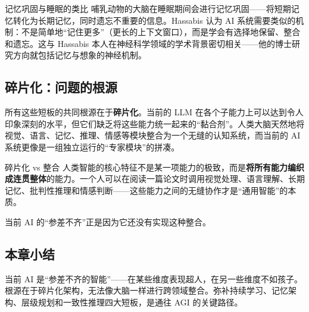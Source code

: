 \begin{knowledgebox}{记忆巩固与睡眠的类比}
哺乳动物的大脑在睡眠期间会进行记忆巩固——将短期记忆转化为长期记忆，同时遗忘不重要的信息。Hassabis 认为 AI 系统需要类似的机制：不是简单地``记住更多''（更长的上下文窗口），而是学会有选择地保留、整合和遗忘。这与 Hassabis 本人在神经科学领域的学术背景密切相关——他的博士研究方向就包括记忆与想象的神经机制。
\end{knowledgebox}

\subsection{碎片化：问题的根源}

所有这些短板的共同根源在于\textbf{碎片化}。当前的 LLM 在各个子能力上可以达到令人印象深刻的水平，但它们缺乏将这些能力统一起来的``黏合剂''。人类大脑天然地将视觉、语言、记忆、推理、情感等模块整合为一个无缝的认知系统，而当前的 AI 系统更像是一组独立运行的``专家模块''的拼凑。

\begin{importantbox}{碎片化 vs 整合}
人类智能的核心特征不是某一项能力的极致，而是\textbf{将所有能力编织成连贯整体}的能力。一个人可以在阅读一篇论文时调用视觉处理、语言理解、长期记忆、批判性推理和情感判断——这些能力之间的无缝协作才是``通用智能''的本质。

当前 AI 的``参差不齐''正是因为它还没有实现这种整合。
\end{importantbox}

\subsection{本章小结}

当前 AI 是``参差不齐的智能''——在某些维度表现超人，在另一些维度不如孩子。根源在于碎片化架构，无法像大脑一样进行跨领域整合。弥补持续学习、记忆架构、层级规划和一致性推理四大短板，是通往 AGI 的关键路径。

